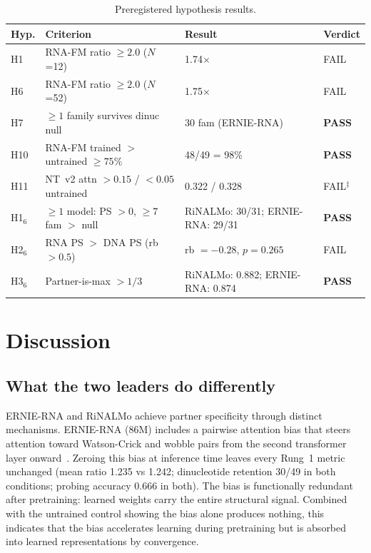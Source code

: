 \documentclass[11pt]{article}
\begin{document}
\begin{table}[htbp]
\centering
\caption{Preregistered hypothesis results.}
\label{tab:hypotheses}
\small
\begin{tabular}{llll}
\toprule
\textbf{Hyp.} & \textbf{Criterion} & \textbf{Result} & \textbf{Verdict} \\
\midrule
H1    & RNA-FM ratio $\geq 2.0$ ($N$=12) & 1.74$\times$ & FAIL \\
H6    & RNA-FM ratio $\geq 2.0$ ($N$=52) & 1.75$\times$ & FAIL \\
H7    & $\geq 1$ family survives dinuc null & 30 fam (ERNIE-RNA) & \textbf{PASS} \\
H10   & RNA-FM trained $>$ untrained $\geq 75$\% & 48/49 = 98\% & \textbf{PASS} \\
H11   & NT~v2 attn $> 0.15$ / $< 0.05$ untrained & 0.322 / 0.328 & FAIL$^\ddagger$ \\
\midrule
H1$_6$ & $\geq 1$ model: PS $> 0$, $\geq 7$ fam $>$ null & RiNALMo: 30/31; ERNIE-RNA: 29/31 & \textbf{PASS} \\
H2$_6$ & RNA PS $>$ DNA PS (rb $> 0.5$) & rb $= -0.28$, $p = 0.265$ & FAIL \\
H3$_6$ & Partner-is-max $> 1/3$ & RiNALMo: 0.882; ERNIE-RNA: 0.874 & \textbf{PASS} \\
\bottomrule
\end{tabular}

\smallskip{}
\end{table}


\section{Discussion}

\subsection{What the two leaders do differently}

ERNIE-RNA and RiNALMo achieve partner specificity through distinct
mechanisms. ERNIE-RNA (86M) includes a pairwise attention bias that
steers attention toward Watson-Crick and wobble pairs from the
second transformer layer onward~\citep{ernierna2025}. Zeroing this
bias at inference time leaves every Rung~1 metric unchanged (mean
ratio 1.235 vs 1.242; dinucleotide retention 30/49 in both
conditions; probing accuracy 0.666 in both). The bias is functionally
redundant after pretraining: learned weights carry the entire
structural signal. Combined with the untrained control showing the
bias alone produces nothing, this indicates that the bias accelerates
learning during pretraining but is absorbed into learned
representations by convergence.
\end{document}
